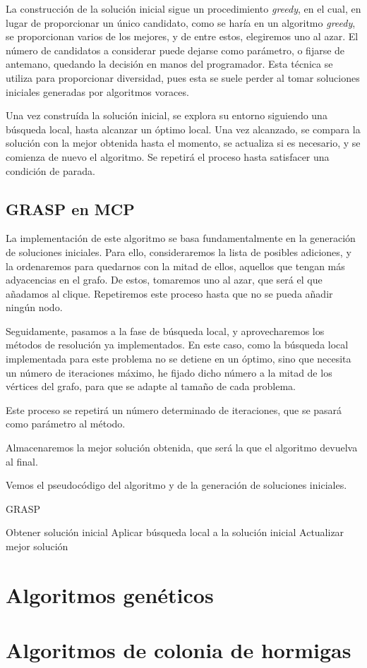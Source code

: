 La construcción de la solución inicial sigue un procedimiento \textit{greedy}, en el cual, en lugar de
proporcionar un único candidato, como se haría en un algoritmo \textit{greedy}, se proporcionan
varios de los mejores, y de entre estos, elegiremos uno al azar. El número de candidatos a considerar
puede dejarse como parámetro, o fijarse de antemano, quedando la decisión en manos del programador.
Esta técnica se utiliza para proporcionar diversidad, pues esta se suele perder al tomar soluciones iniciales
generadas por algoritmos voraces.

Una vez construída la solución inicial, se explora su entorno siguiendo una búsqueda local, hasta alcanzar
un óptimo local. Una vez alcanzado, se compara la solución con la mejor obtenida hasta el momento, se
actualiza si es necesario, y se comienza de nuevo el algoritmo. Se repetirá el proceso hasta satisfacer
una condición de parada.

\subsection{GRASP en MCP}

La implementación de este algoritmo se basa fundamentalmente en la generación de soluciones iniciales.
Para ello, consideraremos la lista de posibles adiciones, y la ordenaremos para quedarnos con la mitad
de ellos, aquellos que tengan más adyacencias en el grafo. De estos, tomaremos uno al azar, que será
el que añadamos al clique. Repetiremos este proceso hasta que no se pueda añadir ningún nodo.

Seguidamente, pasamos a la fase de búsqueda local, y aprovecharemos los métodos de resolución ya implementados.
En este caso, como la búsqueda local implementada para este problema no se detiene en un óptimo, sino que
necesita un número de iteraciones máximo, he fijado dicho número a la mitad de los vértices del grafo, para
que se adapte al tamaño de cada problema.

Este proceso se repetirá un número determinado de iteraciones, que se pasará como parámetro al método.

Almacenaremos la mejor solución obtenida, que será la que el algoritmo devuelva al final.

Vemos el pseudocódigo del algoritmo y de la generación de soluciones iniciales.

\begin{algorithm}[H]
\caption{GRASP}
  \begin{algorithmic}
  \Repeat
    \State Obtener solución inicial
    \State Aplicar búsqueda local a la solución inicial
    \State Actualizar mejor solución
  \end{algorithmic}
\end{algorithm}


\section{Algoritmos genéticos}

\section{Algoritmos de colonia de hormigas}
